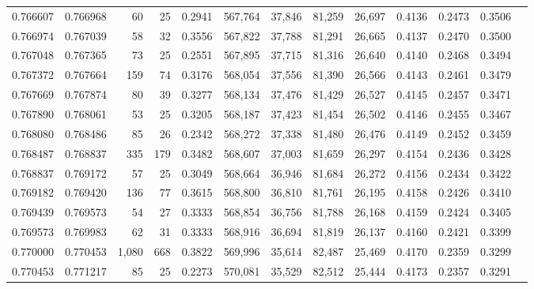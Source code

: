 \begin{tabular}{rrrrrrrrrrrrr}
0.766607 & 0.766968 &    60 &  25 &                                     0.2941 & 567,764 &  37,846 &  81,259 &  26,697 & 0.4136 & 0.2473 & 0.3506 \\
0.766974 & 0.767039 &    58 &  32 &                                     0.3556 & 567,822 &  37,788 &  81,291 &  26,665 & 0.4137 & 0.2470 & 0.3500 \\
0.767048 & 0.767365 &    73 &  25 &                                     0.2551 & 567,895 &  37,715 &  81,316 &  26,640 & 0.4140 & 0.2468 & 0.3494 \\
0.767372 & 0.767664 &   159 &  74 &                                     0.3176 & 568,054 &  37,556 &  81,390 &  26,566 & 0.4143 & 0.2461 & 0.3479 \\
0.767669 & 0.767874 &    80 &  39 &                                     0.3277 & 568,134 &  37,476 &  81,429 &  26,527 & 0.4145 & 0.2457 & 0.3471 \\
0.767890 & 0.768061 &    53 &  25 &                                     0.3205 & 568,187 &  37,423 &  81,454 &  26,502 & 0.4146 & 0.2455 & 0.3467 \\
0.768080 & 0.768486 &    85 &  26 &                                     0.2342 & 568,272 &  37,338 &  81,480 &  26,476 & 0.4149 & 0.2452 & 0.3459 \\
0.768487 & 0.768837 &   335 & 179 &                                     0.3482 & 568,607 &  37,003 &  81,659 &  26,297 & 0.4154 & 0.2436 & 0.3428 \\
0.768837 & 0.769172 &    57 &  25 &                                     0.3049 & 568,664 &  36,946 &  81,684 &  26,272 & 0.4156 & 0.2434 & 0.3422 \\
0.769182 & 0.769420 &   136 &  77 &                                     0.3615 & 568,800 &  36,810 &  81,761 &  26,195 & 0.4158 & 0.2426 & 0.3410 \\
0.769439 & 0.769573 &    54 &  27 &                                     0.3333 & 568,854 &  36,756 &  81,788 &  26,168 & 0.4159 & 0.2424 & 0.3405 \\
0.769573 & 0.769983 &    62 &  31 &                                     0.3333 & 568,916 &  36,694 &  81,819 &  26,137 & 0.4160 & 0.2421 & 0.3399 \\
0.770000 & 0.770453 & 1,080 & 668 &                                     0.3822 & 569,996 &  35,614 &  82,487 &  25,469 & 0.4170 & 0.2359 & 0.3299 \\
0.770453 & 0.771217 &    85 &  25 &                                     0.2273 & 570,081 &  35,529 &  82,512 &  25,444 & 0.4173 & 0.2357 & 0.3291 \\

\end{tabular}
